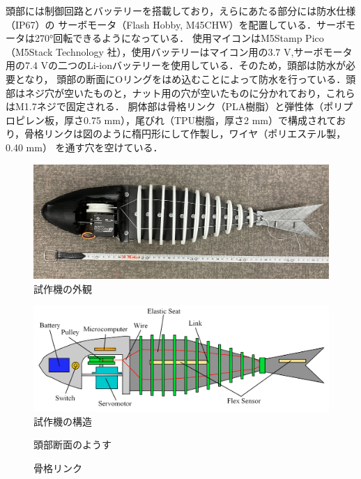 頭部には制御回路とバッテリーを搭載しており，えらにあたる部分には防水仕様（IP67）の サーボモータ（Flash Hobby, M45CHW）を配置している．サーボモータは270°回転できるようになっている．
使用マイコンはM5Stamp Pico（M5Stack Technology 社），使用バッテリーはマイコン用の3.7 V,サーボモータ用の7.4 Vの二つのLi-ionバッテリーを使用している．そのため，頭部は防水が必要となり，
頭部の断面にOリングをはめ込むことによって防水を行っている．頭部はネジ穴が空いたものと，ナット用の穴が空いたものに分かれており，これらはM1.7ネジで固定される．
胴体部は骨格リンク（PLA樹脂）と弾性体（ポリプロピレン板，厚さ0.75 mm），尾びれ（TPU樹脂，厚さ2 mm）で構成されており，骨格リンクは図のように楕円形にして作製し，ワイヤ（ポリエステル製，0.40 mm）
を通す穴を空けている．

\begin{figure}[t]
    \centering
    \includegraphics[width=0.80\linewidth]{chapters/picture/sisaku.jpg}
    \caption{試作機の外観}
    \label{fig:sisaku}
\end{figure}
\begin{figure}[t]
    \centering
    \includegraphics[width=0.80\linewidth]{chapters/picture/tentativeschematic.png}
    \caption{試作機の構造}
    \label{fig:kouzou_sisaku}
\end{figure}
\begin{figure}[t]
    \centering
     \begin{minipage}[b]{0.50\linewidth}
        \centering
        \caption{頭部断面のようす}
        \label{fig:danmen}
     \end{minipage}
     \hspace{0.05\linewidth}
     \begin{minipage}[b]{0.25\linewidth}
        \centering
        \caption{骨格リンク}
        \label{fig:link_sen}
     \end{minipage}
\end{figure}

